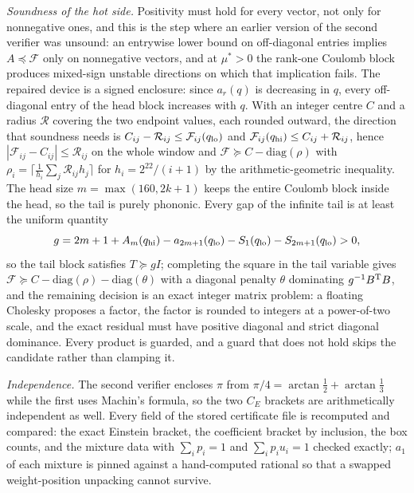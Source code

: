 \documentclass[11pt]{article}
\newcommand{\Fcal}{\mathcal F}
\newcommand{\muS}{\mu^{*}}
\theoremstyle{definition}
\theoremstyle{remark}
\begin{document}
\emph{Soundness of the hot side.} Positivity must hold for every vector, not only for
nonnegative ones, and this is the step where an earlier version of the second verifier was
unsound: an entrywise lower bound on off-diagonal entries implies $A\preceq\Fcal$ only on
nonnegative vectors, and at $\muS>0$ the rank-one Coulomb block produces mixed-sign
unstable directions on which that implication fails. The repaired device is a signed
enclosure: since $a_r(q)$ is decreasing in $q$, every off-diagonal entry of the head block
increases with $q$. With an integer centre $C$ and a radius $\mathcal R$ covering the two
endpoint values, each rounded outward, the direction that soundness needs is
$C_{ij}-\mathcal R_{ij}\le\Fcal_{ij}(q_{\rm lo})$ and
$\Fcal_{ij}(q_{\rm hi})\le C_{ij}+\mathcal R_{ij}$, hence
$|\Fcal_{ij}-C_{ij}|\le\mathcal R_{ij}$ on the whole window and
$\Fcal\succeq C-\mathrm{diag}(\rho)$ with $\rho_i=\lceil\frac1{h_i}\sum_j\mathcal
R_{ij}h_j\rceil$ for $h_i=2^{22}/(i+1)$ by the arithmetic-geometric inequality. The head
size $m=\max(160,2k+1)$ keeps the entire Coulomb block inside the head, so the tail is
purely phononic. Every gap of the infinite tail is at least the uniform quantity
\begin{equation}\label{eq:gap}
g=2m+1+A_m(q_{\rm hi})-a_{2m+1}(q_{\rm lo})-S_1(q_{\rm lo})-S_{2m+1}(q_{\rm lo})>0,
\end{equation}
so the tail block satisfies $T\succeq gI$; completing the square in the tail variable gives
$\Fcal\succeq C-\mathrm{diag}(\rho)-\mathrm{diag}(\theta)$ with a diagonal penalty
$\theta$ dominating $g^{-1}B^{\rm T}B$, and the remaining decision is an exact integer
matrix problem: a floating Cholesky proposes a factor, the factor is rounded to integers at
a power-of-two scale, and the exact residual must have positive diagonal and strict
diagonal dominance. Every product is guarded, and a guard that does not hold skips the
candidate rather than clamping it.

\emph{Independence.} The second verifier encloses $\pi$ from
$\pi/4=\arctan\frac12+\arctan\frac13$ while the first uses Machin's formula, so the two
$C_E$ brackets are arithmetically independent as well. Every field of the stored
certificate file is recomputed and compared: the exact Einstein bracket, the coefficient
bracket by inclusion, the box counts, and the mixture data with $\sum_ip_i=1$ and
$\sum_ip_iu_i=1$ checked exactly; $a_1$ of each mixture is pinned against a hand-computed
rational so that a swapped weight-position unpacking cannot survive.
\end{document}
